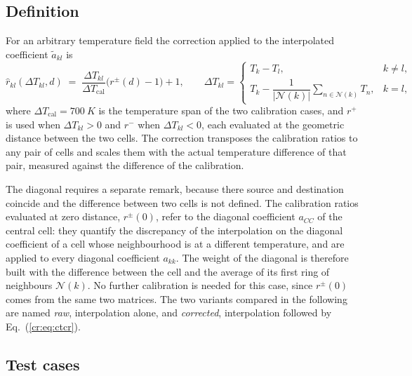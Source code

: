 \subsection{Definition}

For an arbitrary temperature field the correction applied to the interpolated
coefficient $\tilde a_{kl}$ is
%
\begin{equation}
  \hat r_{kl}(\Delta T_{kl},d) \;=\;
  \frac{\Delta T_{kl}}{\Delta T_{\mathrm{cal}}}\big(r^{\pm}(d) - 1\big) + 1,
  \qquad
  \Delta T_{kl} =
  \begin{cases}
    T_k - T_l, & k \neq l, \\[6pt]
    T_k - \dfrac{1}{|\mathcal N(k)|}\displaystyle\sum_{n\in\mathcal N(k)} T_n, & k = l,
  \end{cases}
  \label{cr:eq:ctcr}
\end{equation}
%
where $\Delta T_{\mathrm{cal}} = \SI{700}{K}$ is the temperature span of the
two calibration cases, and $r^{+}$ is used when $\Delta T_{kl}>0$ and $r^{-}$
when $\Delta T_{kl}<0$, each evaluated at the geometric distance between the
two cells. The correction transposes the calibration ratios to any pair of
cells and scales them with the actual temperature difference of that pair,
measured against the difference of the calibration.

The diagonal requires a separate remark, because there source and destination
coincide
and the difference between two cells is not defined. The calibration ratios
evaluated at zero distance, $r^{\pm}(0)$, refer to the diagonal coefficient
$a_{CC}$ of the central cell: they quantify the discrepancy of the
interpolation on the diagonal coefficient of a cell whose neighbourhood is at a
different temperature, and are applied to every diagonal coefficient $a_{kk}$.
The weight of the diagonal is therefore built with the difference between the cell and
the average of its first ring of neighbours $\mathcal N(k)$. No further
calibration is needed for this case, since $r^{\pm}(0)$ comes from the same two
matrices. The two variants compared in the following are named \emph{raw},
interpolation alone, and \emph{corrected}, interpolation followed by
Eq.~(\ref{cr:eq:ctcr}).

\subsection{Test cases}

